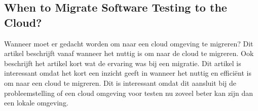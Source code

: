 \subsection{When to Migrate Software Testing to the Cloud?}
Wanneer moet er gedacht worden om naar een cloud omgeving te migreren? Dit artikel \autocite{WTMSTTTC} beschrijft vanaf wanneer het nuttig is om naar de cloud te migreren. Ook beschrijft het artikel kort wat de ervaring was bij een migratie. Dit artikel is interessant omdat het kort een inzicht geeft in wanneer het nuttig en efficiënt is om naar een cloud te migreren. Dit is interessant omdat dit aansluit bij de probleemstelling of een cloud omgeving voor testen nu zoveel beter kan zijn dan een lokale omgeving.


